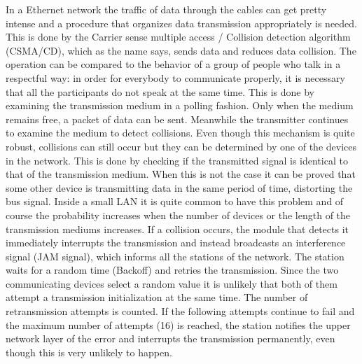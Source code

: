 \documentclass{article}
\begin{document}
In a Ethernet network the traffic of data through the cables can get pretty intense and a procedure that organizes data transmission appropriately is needed. This is done by the Carrier sense multiple access / Collision detection algorithm (CSMA/CD), which as the name says, sends data and reduces data collision. 
\newline
\newline
The operation can be compared to the behavior of a group of people who talk in a respectful way: in order for everybody to communicate properly, it is necessary that all the participants do not speak at the same time. This is done by examining the transmission medium in a polling fashion. Only when the medium remains free, a packet of data can be sent. Meanwhile the transmitter continues to examine the medium to detect collisions. 
\newline
\newline
Even though this mechanism is quite robust, collisions can still occur but they can be determined by one of the devices in the network. This is done by checking if the transmitted signal is identical to that of the transmission medium. When this is not the case it can be proved that some other device is transmitting data in the same period of time, distorting the bus signal. Inside a small LAN it is quite common to have this problem and of course the probability increases when the number of devices or the length of the transmission mediums increases.
\newline
\newline
If a collision occurs,  the module that detects it immediately interrupts the transmission and instead broadcasts an interference signal (JAM signal), which informs all the stations of the network. The station waits for a random time (Backoff) and retries the transmission. Since the two communicating devices select a random value it is unlikely that both of them attempt a transmission initialization at the same time.
\newline
\newline
The number of retransmission attempts is counted. If the following attempts continue to fail and the maximum number of attempts (16) is reached, the station notifies the upper network layer of the error and interrupts the transmission permanently, even though this is very unlikely to happen.
\end{document}
